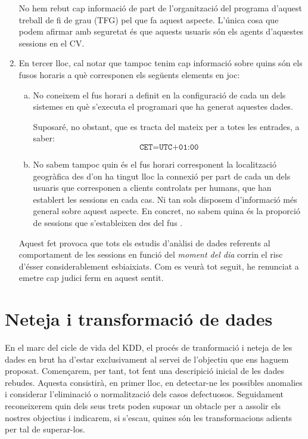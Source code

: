 \documentclass[
	a4paper,
	twoside,
	justified
]{tufte-book}
\begin{document}
\begin{enumerate}[(1)]
No hem rebut cap informació de part de l'organització del programa d'aquest treball de fi de grau (TFG) pel que fa aquest aspecte. L'única cosa que podem afirmar amb seguretat és que aquests usuaris són els agents d'aquestes sessions en el CV.

\item En tercer lloc, cal notar que tampoc tenim cap informació sobre quins són els fusos horaris a què corresponen els següents elements en joc:

	\begin{enumerate}[(a)]
	\item No coneixem el fus horari a definit en la configuració de cada un dels sistemes en què s'executa el programari que ha generat aquestes dades. 
	
	Suposaré, no obstant, que es tracta del mateix per a totes les entrades, a saber:
	$$
		\texttt{CET} = \texttt{UTC+01:00}
	$$
	
	\item No sabem tampoc quin és el fus horari corresponent la localització geogràfica des d'on ha tingut lloc la connexió per part de cada un dels usuaris que corresponen a clients controlats per humans, que han establert les sessions en cada cas. Ni tan sols disposem d'informació més general sobre aquest aspecte. En concret, no sabem quina és la proporció de sessions que s'estableixen des del fus . 
	\end{enumerate}
	
Aquest fet provoca que tots els estudis d'anàlisi de dades referents al comportament de les sessions en funció del \emph{moment del dia} corrin el risc d'ésser considerablement esbiaixiats. Com es veurà tot seguit, he renunciat a emetre cap judici ferm en aquest sentit.  	

\end{enumerate}

\chapter{Neteja i transformació de dades}
\label{sec:data_anomalies}

En el marc del cicle de vida del KDD, el procés de tranformació i neteja de les dades en brut ha d'estar exclusivament al servei de l'objectiu que ens haguem proposat. Començarem, per tant, tot fent una descripició inicial de les dades rebudes. Aquesta consistirà, en primer lloc, en detectar-ne les possibles anomalies i considerar l'eliminació o normalització dels casos defectuosos. Seguidament reconeixerem quin dels seus trets poden suposar un obtacle per a assolir els nostres objectius i indicarem, si s'escau, quines són les transformacions adients per tal de superar-los. 
\end{document}
